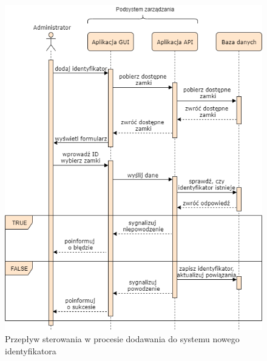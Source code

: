             \begin{figure}[]
                \centering
                \includegraphics[width=.7\linewidth]{chapters/images/sequence5.png}
                \caption{Przepływ sterowania w procesie dodawania do systemu nowego identyfikatora}
                \label{fig:sequence5}
            \end{figure}


                    

